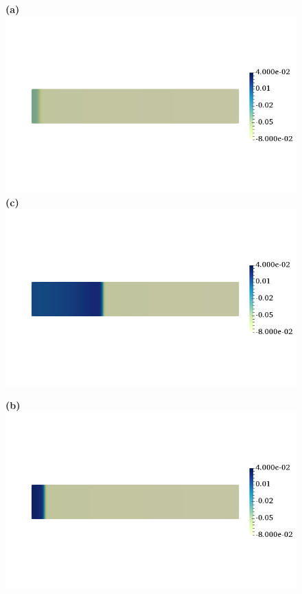 \documentclass[12pt,a4paper]{article}
\begin{document}
\begin{figure}
\begin{minipage}{0.47\textwidth}
 \textbf{(a)} \includegraphics[trim=0cm 4cm 0cm 4cm, clip=true, width=0.9\linewidth]{v5}
      \textbf{(c)} \includegraphics[trim=0cm 4cm 0cm 4cm, clip=true, width=0.9\linewidth]{v100}
    \end{minipage}
    \begin{minipage}{0.47\textwidth}
  \textbf{(b)} \includegraphics[trim=0cm 4cm 0cm 4cm, clip=true, width=0.9\linewidth]{v15}

\end{minipage}
\end{figure}
\end{document}
